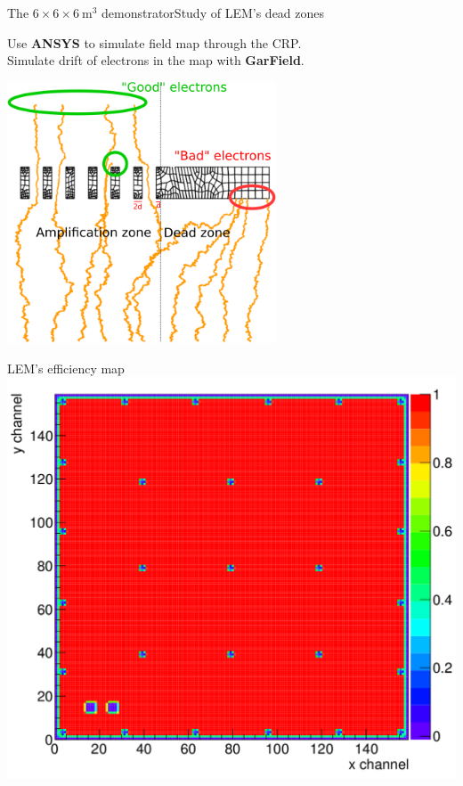 \documentclass[10pt]{beamer}
\begin{document}
\begin{frame}{The \texorpdfstring{$6 \times 6 \times \SI{6}{\meter\cubed}$}{666}
    		 demonstrator}{Study of LEM's dead zones}
\begin{scriptsize}
\begin{minipage}{0.38\textwidth}
    				Use \textbf{ANSYS} to simulate field map through the CRP.\\
    				Simulate drift of electrons in the map with \textbf{GarField}.\\
    		\end{minipage}
    		\begin{minipage}{0.58\textwidth}
    			\centering
    			\includegraphics[width=0.6\textwidth]{figures/666/drift_example.png}\\
    			\vspace{0.5cm} \hspace{0.1cm}
    			\begin{minipage}{0.48\textwidth}
    				\centering
    				LEM's efficiency map\\
    				\includegraphics[width=\textwidth]{figures/666/eff_map.png}

\end{minipage}
\end{minipage}
\end{scriptsize}
\end{frame}
\end{document}
